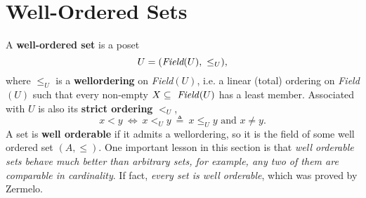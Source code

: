 \documentclass{myproc}
\begin{document}
\section{Well-Ordered Sets}
\bit
\w A {\bf{}well-ordered set} is a poset
	\[ U = (\mbox{\em{}Field}(U),\ \le_U), \]
	where $\le_U$ is a {\bf{}wellordering} on {\em{}Field\/}$(U)$, i.e.
	a linear (total) ordering on {\em{}Field\/}$(U)$ such that
	every non-empty $X \subseteq \mbox{\em{}\ Field\/}(U)$ has a 
	least member.
	\bit
	\w Associated with $U$ is also its {\bf{}strict ordering}
	$<_U$,
	\[ x < y\ \Leftrightarrow\ x <_U y \ \triangleq \ 
	x \le_U y \mbox{\ and\ } x \ne y.\]
	\eit
\w A set is {\bf{}well orderable} if it admits a wellordering, so
	it is the field of some well ordered set $(A, \le)$.
	\bit
	\w One important lesson in this section is that 
		{\em{}well orderable sets behave much better than
		arbitrary sets, for example, any two of them are comparable
		in cardinality\/}.
	\w If fact, {\em{}every set is well orderable\/}, which was
		proved by Zermelo.
	\eit
\eit





\nocite{Moschovakis94,Barwise77,BM96}
\end{document}

